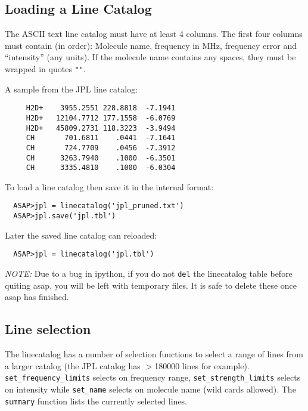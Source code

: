 \documentclass[11pt]{article}
\newcommand{\cmd}[1]{{\tt #1}}
\begin{document}
\hspace{1cm}\cmd{ftp://ftp.atnf.csiro.au/pub/software/asap/data}
  

\subsection{Loading a Line Catalog}

The ASCII text line catalog must have at
least 4 columns. The first four columns must contain (in order):
Molecule name, frequency in MHz, frequency error and ``intensity''
(any units). If the molecule name contains any spaces, they must be
wrapped in quotes \verb+""+.

A sample from the JPL line catalog:

\begin{verbatim}
     H2D+    3955.2551 228.8818  -7.1941  
     H2D+   12104.7712 177.1558  -6.0769  
     H2D+   45809.2731 118.3223  -3.9494  
     CH       701.6811    .0441  -7.1641  
     CH       724.7709    .0456  -7.3912  
     CH      3263.7940    .1000  -6.3501  
     CH      3335.4810    .1000  -6.0304  
\end{verbatim}

To load a line catalog then save it in the internal format:

\begin{verbatim}
  ASAP>jpl = linecatalog('jpl_pruned.txt')
  ASAP>jpl.save('jpl.tbl')
\end{verbatim}

Later the saved line catalog can reloaded:

\begin{verbatim}
  ASAP>jpl = linecatalog('jpl.tbl')
\end{verbatim}

{\em NOTE:} Due to a bug in ipython, if you do not \cmd{del} the
linecatalog table before quiting asap, you will be left with temporary
files. It is safe to delete these once asap has finished.

\subsection{Line selection}

The linecatalog has a number of
selection functions to select a range of lines from a larger catalog
(the JPL catalog has $>$180000 lines for
example). \cmd{set\_frequency\_limits} selects on frequency range,
\cmd{set\_strength\_limits} selects on intensity while \cmd{set\_name}
selects on molecule name (wild cards allowed). The \cmd{summary}
function lists the currently selected lines.
\end{document}
